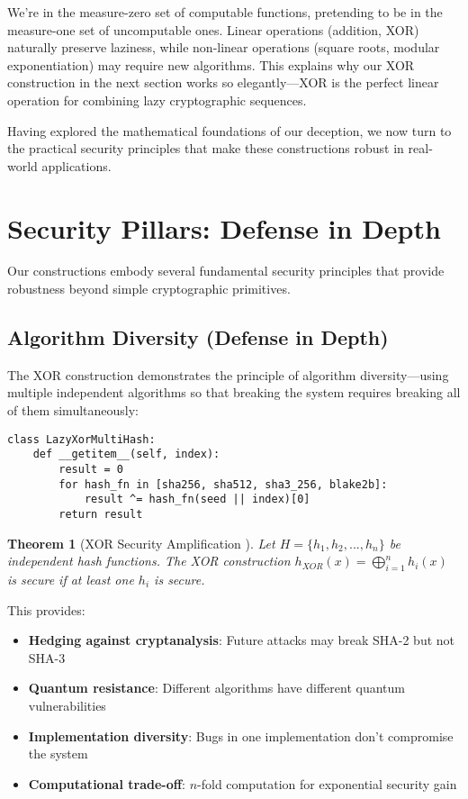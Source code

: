 \documentclass[11pt]{article}
\newtheorem{theorem}{Theorem}
\begin{document}
We're in the measure-zero set of computable functions, pretending to be in the measure-one set of uncomputable ones. Linear operations (addition, XOR) naturally preserve laziness, while non-linear operations (square roots, modular exponentiation) may require new algorithms. This explains why our XOR construction in the next section works so elegantly---XOR is the perfect linear operation for combining lazy cryptographic sequences.

Having explored the mathematical foundations of our deception, we now turn to the practical security principles that make these constructions robust in real-world applications.

\section{Security Pillars: Defense in Depth}

Our constructions embody several fundamental security principles that provide robustness beyond simple cryptographic primitives.

\subsection{Algorithm Diversity (Defense in Depth)}

The XOR construction demonstrates the principle of algorithm diversity---using multiple independent algorithms so that breaking the system requires breaking all of them simultaneously:

\begin{lstlisting}
class LazyXorMultiHash:
    def __getitem__(self, index):
        result = 0
        for hash_fn in [sha256, sha512, sha3_256, blake2b]:
            result ^= hash_fn(seed || index)[0]
        return result
\end{lstlisting}

\begin{theorem}[XOR Security Amplification \cite{maurer2004indistinguishability}]
Let $H = \{h_1, h_2, ..., h_n\}$ be independent hash functions. The XOR construction $h_{XOR}(x) = \bigoplus_{i=1}^{n} h_i(x)$ is secure if at least one $h_i$ is secure.
\end{theorem}

This provides:
\begin{itemize}
\item \textbf{Hedging against cryptanalysis}: Future attacks may break SHA-2 but not SHA-3
\item \textbf{Quantum resistance}: Different algorithms have different quantum vulnerabilities
\item \textbf{Implementation diversity}: Bugs in one implementation don't compromise the system
\item \textbf{Computational trade-off}: $n$-fold computation for exponential security gain
\end{itemize}
\end{document}
